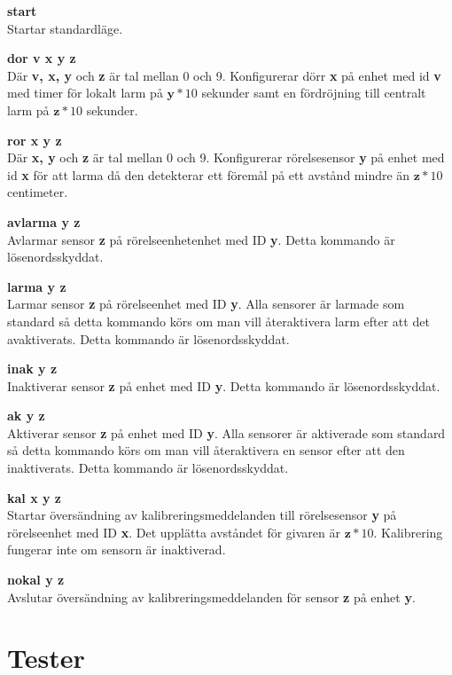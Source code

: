 \documentclass{article}
\begin{document}
    \textbf{start}\\
    Startar standardläge.

    \textbf{dor v x y z}\\
    Där \textbf{v, x, y} och \textbf{z} är tal mellan 0 och 9. Konfigurerar dörr \textbf{x} på enhet med id \textbf{v} med timer för lokalt larm på  \(\textbf{y} * 10\) sekunder samt en fördröjning till centralt larm på \(\textbf{z} * 10\) sekunder.

    \textbf{ror x y z}\\
    Där \textbf{x, y} och \textbf{z} är tal mellan 0 och 9. Konfigurerar rörelsesensor \textbf{y} på enhet med id \textbf{x} för att larma då den detekterar ett föremål på ett avstånd mindre än \(\textbf{z} * 10\) centimeter.

    \textbf{avlarma y z} \\
    Avlarmar sensor \textbf{z} på rörelseenhetenhet med ID \textbf{y}. Detta kommando är lösenordsskyddat.

    \textbf{larma y z} \\
    Larmar sensor \textbf{z} på rörelseenhet med ID \textbf{y}. Alla sensorer är larmade som standard så detta kommando körs om man vill återaktivera larm efter att det avaktiverats. Detta kommando är lösenordsskyddat.

    \textbf{inak y z} \\
    Inaktiverar sensor \textbf{z} på enhet med ID \textbf{y}. Detta kommando är lösenordsskyddat.

    \textbf{ak y z} \\
    Aktiverar sensor \textbf{z} på enhet med ID \textbf{y}. Alla sensorer är aktiverade som standard så detta kommando körs om man vill återaktivera en sensor efter att den inaktiverats. Detta kommando är lösenordsskyddat.

    \textbf{kal x y z} \\
    Startar översändning av kalibreringsmeddelanden till rörelsesensor \textbf{y} på rörelseenhet med ID \textbf{x}. Det upplätta avståndet för givaren är \(\textbf{z} * 10\). Kalibrering fungerar inte om sensorn är inaktiverad.

    \textbf{nokal y z} \\
    Avslutar översändning av kalibreringsmeddelanden för sensor \textbf{z} på enhet \textbf{y}.


	\clearpage
	\section{Tester}
    		\label{bilaga:tester}
     	
	
	
	
         
         
         
         
         
         
\end{document}
